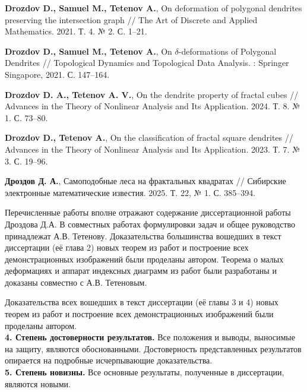 \documentclass[14pt, a4paper]{extarticle}
\begin{document}
\begin{thebibliography}{9}
{\bf Drozdov D., Samuel M., Tetenov A.},
On deformation of polygonal dendrites preserving the intersection graph //
The Art of Discrete and Applied Mathematics. 2021. Т. 4. № 2. С. 1--21.

{\bf Drozdov D., Samuel M., Tetenov A.}, 
On $\delta$-deformations of Polygonal Dendrites // 
Topological Dynamics and Topological Data Analysis. : Springer Singapore, 2021. С. 147--164.

{\bf Drozdov D. A., Tetenov A. V.}, On the dendrite property of fractal cubes // Advances in the Theory of Nonlinear Analysis and Its Application. 2024. Т. 8. № 1. С. 73--80.

{\bf Drozdov D., Tetenov A.}, 
On the classification of fractal square dendrites // 
Advances in the Theory of Nonlinear Analysis and Its Application. 2023. Т. 7. № 3. С. 19--96.

{\bf Дроздов Д. А.}, 
Самоподобные леса на фрактальных квадратах // Сибирские электронные математические известия. 2025. Т. 22, № 1. С. 385--394.

\end{thebibliography}

Перечисленные работы вполне отражают содержание диссертационной работы Дроздова Д.А. 
В совместных работах формулировки задач и общее руководство принадлежат А.В. Тетенову.
Доказательства большинства вошедших в текст диссертации (её глава 2) новых теорем из работ \cite{DST2021, DST2022} и построение всех демонстрационных изображений были проделаны автором.
Теорема о малых деформациях и аппарат индексных диаграмм из работ \cite{DST2021, DST2022} были разработаны и доказаны совместно с А.В. Тетеновым.

Доказательства всех вошедших в текст диссертации (её главы 3 и 4) новых теорем из работ \cite{DT2024fqd, TD2023fs} и построение всех демонстрационных изображений были проделаны автором.\\

{\bf 4. Степень достоверности результатов.}
Все положения и выводы, выносимые на защиту, являются обоснованными.
Достоверность представленных результатов опирается на подробные исчерпывающие доказательства.\\

{\bf 5. Степень новизны.}
Все основные результаты, полученные в диссертации, являются новыми.\\
\end{document}
